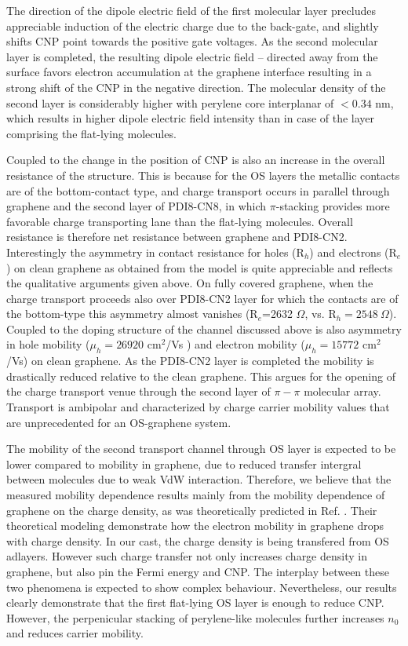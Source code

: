 \documentclass[preprint,aip,jap]{revtex4-2}
\begin{document}
  The direction of the dipole electric field of the first molecular layer precludes appreciable induction of the electric charge due to the back-gate, and slightly shifts CNP point towards the positive gate voltages.
 As the second molecular layer is completed, the resulting dipole electric field -- directed away from the surface favors electron accumulation at the graphene interface resulting in a strong shift of the CNP in the negative direction.
  The molecular density of the second layer is considerably higher with perylene core interplanar of $< 0.34$ nm, which results in higher dipole electric field intensity than in  case of the layer comprising the flat-lying molecules.


Coupled to the change in the position of CNP is also an increase in the overall resistance of the structure.
 This is because for the OS layers the metallic contacts are of the  bottom-contact type, and charge transport occurs in parallel through graphene and the second layer of PDI8-CN8, in which $\pi$-stacking provides more favorable charge transporting lane than the flat-lying molecules.
 Overall resistance is therefore net resistance between graphene and PDI8-CN2.
 Interestingly the asymmetry in contact resistance for holes (R$_{h}$) and  electrons  (R$_{e}$) on clean graphene as obtained from the model is quite appreciable and reflects the qualitative arguments given above.
  On fully covered graphene, when the charge transport proceeds also over PDI8-CN2 layer for which the contacts are of the bottom-type this asymmetry almost vanishes (R$_{e}$=2632 $\Omega$, vs. R$_{h}=2548\ \Omega$).
  Coupled to the doping structure of the channel discussed above is also asymmetry in hole mobility  ($\mu_{h}= 26920$ cm$^{2}$/Vs ) and electron mobility ($\mu_{h}= 15772$ cm$^{2}$/Vs) on clean graphene.
 As the PDI8-CN2 layer is completed the mobility is drastically reduced relative to the clean graphene.
  This argues for the opening of the charge transport venue through the second layer of $\pi-\pi$ molecular array.
 Transport is ambipolar and characterized by charge carrier mobility values that are unprecedented for an OS-graphene system.

 The mobility of the second transport channel through OS layer is expected to be lower compared
 to mobility in graphene, due to reduced transfer intergral between molecules due to weak VdW interaction.
 Therefore, we believe that the measured mobility dependence results mainly from the mobility dependence of graphene on the
 charge density, as was theoretically predicted in Ref. .
 Their theoretical modeling demonstrate how the electron mobility in graphene drops with charge density.
 In our cast, the charge density is being transfered from OS adlayers.
 However such charge transfer not only increases charge density in graphene, but also pin the Fermi energy and CNP.
 The interplay between these two phenomena is expected to show complex behaviour.
 Nevertheless, our results clearly demonstrate that the first flat-lying OS layer is enough to reduce CNP.
 However, the perpenicular stacking of perylene-like molecules further increases $n_0$ and reduces carrier mobility. 
\end{document}
